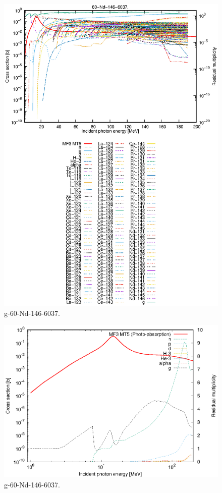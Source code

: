 \begin{figure}
 \includegraphics[width=\linewidth]{eps/g_60-Nd-146_6037.eps}
  \caption{g-60-Nd-146-6037.}
\end{figure}
\newpage \clearpage

\begin{figure}
 \includegraphics[width=\linewidth]{eps-log/g_60-Nd-146_6037.eps}
 \caption{g-60-Nd-146-6037.}
\end{figure}
\newpage \clearpage


